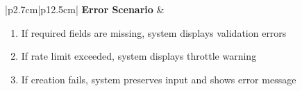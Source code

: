 \begin{table}[H]
\begin{tabular}{|p{2.7cm}|p{12.5cm}|}
        \hline
        \textbf{Error Scenario} & \begin{minipage}[t]{\linewidth}
                                      \begin{enumerate}[topsep=0pt,itemsep=1pt,parsep=0pt,partopsep=0pt]
                                          \item If required fields are missing, system displays validation errors
                                          \item If rate limit exceeded, system displays throttle warning
                                          \item If creation fails, system preserves input and shows error message
                                      \end{enumerate}
                                  \end{minipage} \\
        \hline
    \end{tabular}
    \label{tab:teacher-create-tp}
\end{table}

